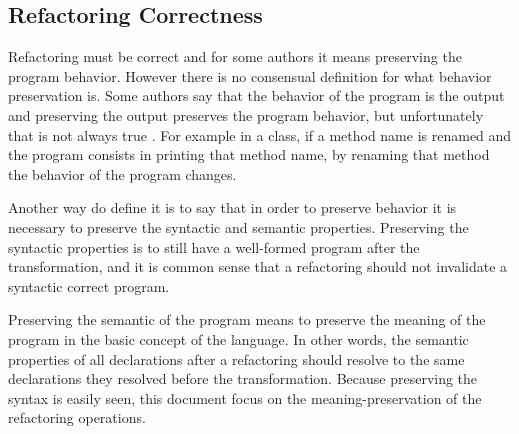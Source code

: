 

\subsection{Refactoring Correctness}
Refactoring must be correct and for some authors it means preserving the program behavior.
However there is no consensual definition for what behavior preservation is.
Some authors say that the behavior of the program is the output and preserving the output preserves the program behavior, but unfortunately that is not always true \cite{waite1984compiler}.
For example in a class, if a method name is renamed and the program consists in printing that method name, by renaming that method the behavior of the program changes.

Another way do define it is to say that in order to preserve behavior it is necessary to preserve the syntactic and semantic properties.
Preserving the syntactic properties is to still have a well-formed program after the transformation, and it is common sense that a refactoring should not invalidate a syntactic correct program.

Preserving the semantic of the program means to preserve the meaning of the program in the basic concept of the language. 
In other words, the semantic properties of all declarations after a refactoring should resolve to the same declarations they resolved before the transformation.
Because preserving the syntax is easily seen, this document focus on the meaning-preservation of the refactoring operations. 



